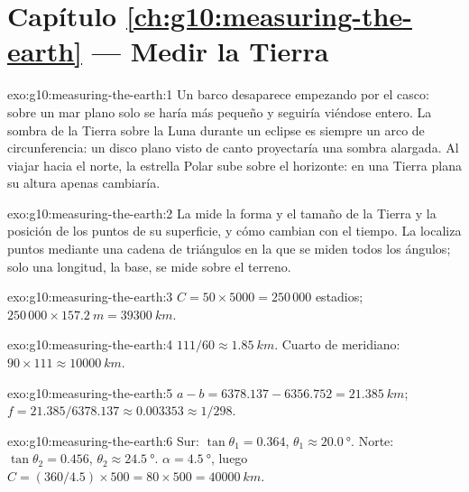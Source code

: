 \section*{Capítulo \ref{ch:g10:measuring-the-earth} --- Medir la Tierra}

\begin{solution}{exo:g10:measuring-the-earth:1}
Un barco desaparece empezando por el casco: sobre un mar plano solo se
haría más pequeño y seguiría viéndose entero. La sombra de la Tierra sobre la
Luna durante un eclipse es siempre un arco de circunferencia: un disco plano
visto de canto proyectaría una sombra alargada. Al viajar hacia el norte, la
estrella Polar sube sobre el horizonte: en una Tierra plana su altura apenas
cambiaría.
\end{solution}

\begin{solution}{exo:g10:measuring-the-earth:2}
La  mide la forma y el tamaño de la Tierra y la posición de los
puntos de su superficie, y cómo cambian con el tiempo. La 
localiza puntos mediante una cadena de triángulos en la que se miden todos
los ángulos; solo una longitud, la base, se mide sobre el terreno.
\end{solution}

\begin{solution}{exo:g10:measuring-the-earth:3}
$C = 50 \times 5000 = 250\,000$ estadios; $250\,000 \times \qty{157.2}{m} =
\qty{39300}{km}$.
\end{solution}

\begin{solution}{exo:g10:measuring-the-earth:4}
$111/60 \approx \qty{1.85}{km}$. Cuarto de meridiano: $90 \times 111 \approx
\qty{10000}{km}$.
\end{solution}

\begin{solution}{exo:g10:measuring-the-earth:5}
$a - b = 6378.137 - 6356.752 = \qty{21.385}{km}$;
$f = 21.385/6378.137 \approx 0.003353 \approx 1/298$.
\end{solution}

\begin{solution}{exo:g10:measuring-the-earth:6}
Sur: $\tan\theta_1 = 0.364$, $\theta_1 \approx \qty{20.0}{\degree}$. Norte:
$\tan\theta_2 = 0.456$, $\theta_2 \approx \qty{24.5}{\degree}$.
$\alpha = \qty{4.5}{\degree}$, luego $C = (360/4.5) \times 500 = 80 \times 500 =
\qty{40000}{km}$.
\end{solution}

